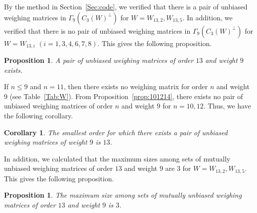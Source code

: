 \documentclass[12pt]{article}
\newtheorem{prop}[thm]{Proposition}
\newtheorem{cor}[thm]{Corollary}
\theoremstyle{remark}
\begin{document}
By the method in Section~\ref{Sec:code}, we verified that
there is a pair of unbiased weighing matrices in $\Gamma_9(C_3(W)^\perp)$
for $W=W_{13, 2}, W_{13, 5}$.
In addition, we verified that there is no pair of unbiased weighing matrices in $\Gamma_9(C_3(W)^\perp)$
for $W=W_{13, i}$ $(i=1,3,4,6,7,8)$.
This gives the following proposition.

\begin{prop}\label{prop:13}
A pair of unbiased weighing matrices of order $13$ and weight $9$ exists.
\end{prop}




If $n \le 9$ and $n=11$, then
there exists no weighing matrix for order $n$ and weight $9$ (see Table~\ref{Tab:W}).
From Proposition~\ref{prop:101214}, 
there exists no pair of unbiased weighing matrices of
order $n$ and weight $9$ for $n=10, 12$.
Thus, we have the following corollary.

\begin{cor}\label{cor:1}
The smallest order for which there exists a pair of unbiased weighing matrices of weight $9$
is $13$.
\end{cor}



In addition, we calculated that the maximum sizes among sets of mutually
unbiased weighing matrices of order $13$ and weight $9$ are $3$ for 
$W=W_{13,2}, W_{13,5}$.
This gives the following proposition.

\begin{prop}\label{prop:13-2}
The maximum size among sets of mutually
unbiased weighing matrices of order $13$ and weight $9$ is $3$.
\end{prop}
\end{document}
